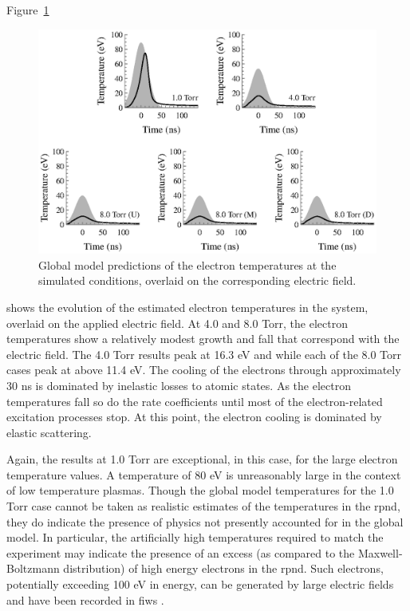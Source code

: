 Figure~\ref{fig:etemps}
\begin{figure}
  \centering
  \includegraphics{./chapters/modeling/figures/etemps.eps}
  \caption{Global model predictions of the electron temperatures at the
  simulated conditions, overlaid on the corresponding electric field.}
  \label{fig:etemps}
\end{figure}
shows the evolution of the estimated electron temperatures in the system,
overlaid on the applied electric field. At 4.0 and 8.0 Torr, the electron
temperatures show a relatively modest growth and fall that correspond with the
electric field. The 4.0 Torr results peak at 16.3 eV and while each of the 8.0
Torr cases peak at above 11.4 eV. The cooling of the electrons through
approximately 30 ns is dominated by inelastic losses to atomic states. As the
electron temperatures fall so do the rate coefficients until most of the
electron-related excitation processes stop. At this point, the electron cooling
is dominated by elastic scattering.

Again, the results at 1.0 Torr are exceptional, in this case, for the large
electron temperature values. A temperature of 80 eV is unreasonably large in the
context of low temperature plasmas. Though the global model temperatures for the
1.0 Torr case cannot be taken as realistic estimates of the temperatures in the
\acs{rpnd}, they do indicate the presence of physics not presently accounted for
in the global model. In particular, the artificially high temperatures required
to match the experiment may indicate the presence of an excess (as compared to
the Maxwell-Boltzmann distribution) of high energy electrons in the \acs{rpnd}.
Such electrons, potentially exceeding 100 eV in energy, can be generated by
large electric fields and have been recorded in \acs{fiw}s \cite{Yatom2011}.

